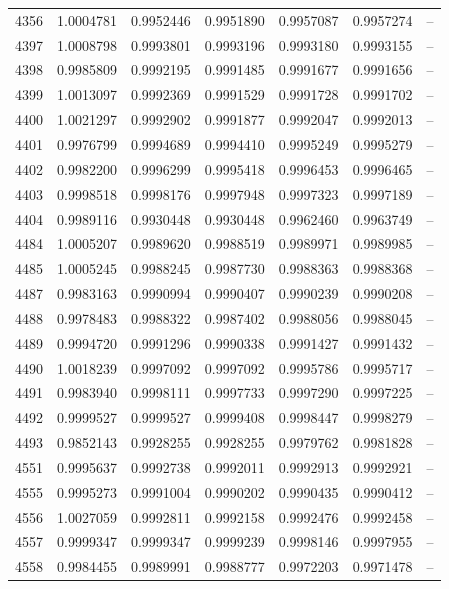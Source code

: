 \begin{longtable}{rrrrrrr}
4356 & 1.0004781 & 0.9952446 & 0.9951890 & 0.9957087 & 0.9957274 & --\\
4397 & 1.0008798 & 0.9993801 & 0.9993196 & 0.9993180 & 0.9993155 & --\\
4398 & 0.9985809 & 0.9992195 & 0.9991485 & 0.9991677 & 0.9991656 & --\\
4399 & 1.0013097 & 0.9992369 & 0.9991529 & 0.9991728 & 0.9991702 & --\\
4400 & 1.0021297 & 0.9992902 & 0.9991877 & 0.9992047 & 0.9992013 & --\\
4401 & 0.9976799 & 0.9994689 & 0.9994410 & 0.9995249 & 0.9995279 & --\\
4402 & 0.9982200 & 0.9996299 & 0.9995418 & 0.9996453 & 0.9996465 & --\\
4403 & 0.9998518 & 0.9998176 & 0.9997948 & 0.9997323 & 0.9997189 & --\\
4404 & 0.9989116 & 0.9930448 & 0.9930448 & 0.9962460 & 0.9963749 & --\\
4484 & 1.0005207 & 0.9989620 & 0.9988519 & 0.9989971 & 0.9989985 & --\\
4485 & 1.0005245 & 0.9988245 & 0.9987730 & 0.9988363 & 0.9988368 & --\\
4487 & 0.9983163 & 0.9990994 & 0.9990407 & 0.9990239 & 0.9990208 & --\\
4488 & 0.9978483 & 0.9988322 & 0.9987402 & 0.9988056 & 0.9988045 & --\\
4489 & 0.9994720 & 0.9991296 & 0.9990338 & 0.9991427 & 0.9991432 & --\\
4490 & 1.0018239 & 0.9997092 & 0.9997092 & 0.9995786 & 0.9995717 & --\\
4491 & 0.9983940 & 0.9998111 & 0.9997733 & 0.9997290 & 0.9997225 & --\\
4492 & 0.9999527 & 0.9999527 & 0.9999408 & 0.9998447 & 0.9998279 & --\\
4493 & 0.9852143 & 0.9928255 & 0.9928255 & 0.9979762 & 0.9981828 & --\\
4551 & 0.9995637 & 0.9992738 & 0.9992011 & 0.9992913 & 0.9992921 & --\\
4555 & 0.9995273 & 0.9991004 & 0.9990202 & 0.9990435 & 0.9990412 & --\\
4556 & 1.0027059 & 0.9992811 & 0.9992158 & 0.9992476 & 0.9992458 & --\\
4557 & 0.9999347 & 0.9999347 & 0.9999239 & 0.9998146 & 0.9997955 & --\\
4558 & 0.9984455 & 0.9989991 & 0.9988777 & 0.9972203 & 0.9971478 & --\\
\bottomrule\end{longtable}\normalsize